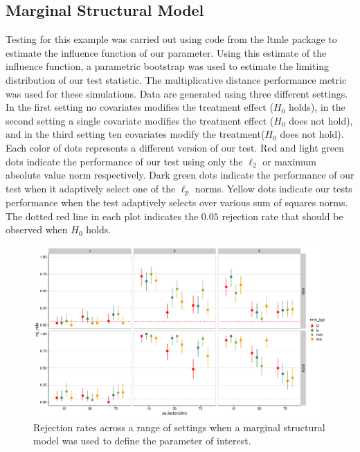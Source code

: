 \documentclass{article}
\begin{document}
\subsection*{Marginal Structural Model}
Testing for this example was carried out using code from the ltmle package \citep{lendle_ltmle_2017} to estimate the influence function of our parameter.  Using this estimate of the influence function, a parametric bootstrap was used to estimate the limiting distribution of our test statistic.  The multiplicative distance performance metric was used for these simulations. Data are generated using three  different settings.  In the first setting no covariates modifies the treatment effect ($H_0$ holds), in the second setting a single covariate modifies the treatment effect ($H_0$ does not hold), and in the third setting ten covariates modify the treatment($H_0$ does not hold). Each color of dots represents a different version of our test. Red and light green dots indicate the performance of our test using only the $\ell_2$ or maximum absolute value norm respectively.  Dark green dots indicate the performance of our test when it adaptively select one of the $\ell_p$ norms. Yellow dots indicate our tests performance when the test adaptively selects over various sum of squares norms. The dotted red line in each plot indicates the $0.05$ rejection rate that should be observed when $H_0$ holds. 

\begin{figure}[H]
	\centering
	\includegraphics[width = \linewidth]{mag_w_unc_de3.pdf}
	\caption{Rejection rates across a range of settings when a marginal structural model was used to define the parameter of interest.}
	\label{fig:de3}
\end{figure}
\end{document}
